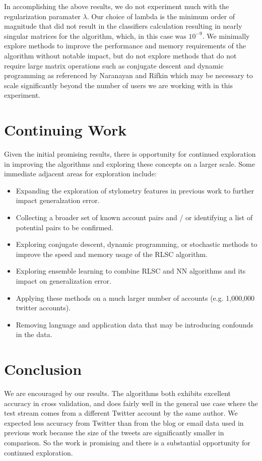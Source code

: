 \documentclass[10pt, conference, compsocconf]{IEEEtran}
\begin{document}
In accomplishing the above results, we do not experiment much with the
regularization paramater $\lambda$.  Our choice of lambda is the
minimum order of magnitude that did not result in the classifiers
calculation resulting in nearly singular matrices for the algorithm,
which, in this case was $10^{-9}$.  We minimally explore methods to
improve the performance and memory requirements of the algorithm
without notable impact, but do not explore methods that do not require
large matrix operations such as conjugate descent and dynamic
programming as referenced by Naranayan and Rifkin \cite{Rifkin} which
may be necessary to scale significantly beyond the number of users we
are working with in this experiment.

\section {Continuing Work}

Given the initial promising results, there is opportunity for continued exploration in improving the algorithms and exploring these concepts on a larger scale. Some immediate adjacent areas for exploration include:

\begin{itemize}
\item Expanding the exploration of stylometry features in previous work to further impact generalzation error.
\item Collecting a broader set of known account pairs and / or identifying a list of potential pairs to be confirmed.
\item Exploring conjugate descent, dynamic programming,  or stochastic methods to improve the speed and memory usage of the RLSC algorithm.
\item Exploring ensemble learning to combine RLSC and NN algorithms and its impact on generalization error.
\item Applying these methods on a much larger number of accounts (e.g. 1,000,000 twitter accounts).
\item Removing language and application data that may be introducing confounds in the data.
\end{itemize}

\section{Conclusion}

We are encouraged by our results. The algorithms both exhibits
excellent accuracy in cross validation, and  does fairly well in
the general use case where the test stream comes from a different
Twitter account by the same author. We expected less accuracy from
Twitter than from the blog or email data used in previous work because
the size of the tweets are significantly smaller in comparison. So the work is promising and
there is a substantial opportunity for continued exploration.
\end{document}
